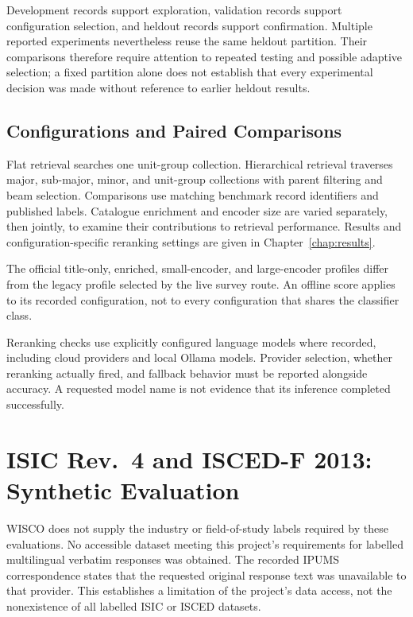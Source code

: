 Development records support exploration, validation records support
configuration selection, and heldout records support confirmation.
Multiple reported experiments nevertheless reuse the same heldout
partition. Their comparisons therefore require attention to repeated
testing and possible adaptive selection; a fixed partition alone does
not establish that every experimental decision was made without reference
to earlier heldout results.

\subsection{Configurations and Paired Comparisons}

Flat retrieval searches one unit-group collection. Hierarchical retrieval
traverses major, sub-major, minor, and unit-group collections with
parent filtering and beam selection. Comparisons use matching benchmark
record identifiers and published labels. Catalogue enrichment and encoder
size are varied separately, then jointly, to examine their contributions
to retrieval performance. Results and configuration-specific reranking
settings are given in Chapter~\ref{chap:results}.

The official title-only, enriched, small-encoder, and large-encoder
profiles differ from the legacy profile selected by the live survey
route. An offline score applies to its recorded configuration, not to
every configuration that shares the classifier class.

Reranking checks use explicitly configured language models where recorded,
including cloud providers and local Ollama models. Provider selection,
whether reranking actually fired, and fallback behavior must be reported
alongside accuracy. A requested model name is not evidence that its
inference completed successfully.

\section{ISIC Rev.~4 and ISCED-F 2013: Synthetic Evaluation}
\label{sec:eval-synthetic}

WISCO does not supply the industry or field-of-study labels required by
these evaluations. No accessible dataset meeting this project's
requirements for labelled multilingual verbatim responses was obtained.
The recorded IPUMS correspondence states that the requested original
response text was unavailable to that provider. This establishes a
limitation of the project's data access, not the nonexistence of all
labelled ISIC or ISCED datasets.

